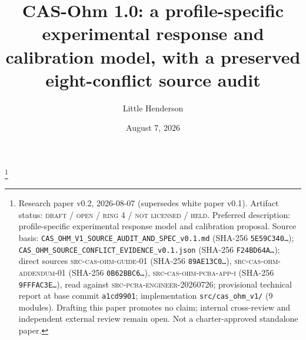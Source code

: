 \documentclass[11pt]{amsart}
\theoremstyle{definition}
\theoremstyle{remark}
\begin{document}
\title[CAS-Ohm 1.0: a profile-specific response model]{CAS-Ohm 1.0: a profile-specific experimental response and calibration model, with a preserved eight-conflict source audit}
\author{Little Henderson}
\thanks{Research paper v0.2, 2026-08-07 (supersedes white paper v0.1). Artifact status: \textsc{draft / open / ring 4 / not licensed / held}. Preferred description: profile-specific experimental response model and calibration proposal. Source basis: \texttt{CAS\_OHM\_V1\_SOURCE\_AUDIT\_AND\_SPEC\_v0.1.md} (SHA-256 \texttt{5E59C340\ldots}); \texttt{CAS\_OHM\_SOURCE\_CONFLICT\_EVIDENCE\_v0.1.json} (SHA-256 \texttt{F24BD64A\ldots}); direct sources \textsc{src-cas-ohm-guide-01} (SHA-256 \texttt{89AE13C0\ldots}), \textsc{src-cas-ohm-addendum-01} (SHA-256 \texttt{0B62BBC6\ldots}), \textsc{src-cas-ohm-pcba-app-i} (SHA-256 \texttt{9FFFAC3E\ldots}), read against \textsc{src-pcba-engineer-20260726}; provisional technical report at base commit \texttt{a1cd9901}; implementation \texttt{src/cas\_ohm\_v1/} (9 modules). Drafting this paper promotes no claim; internal cross-review and independent external review remain open. Not a charter-approved standalone paper.}
\date{August 7, 2026}
\end{document}
